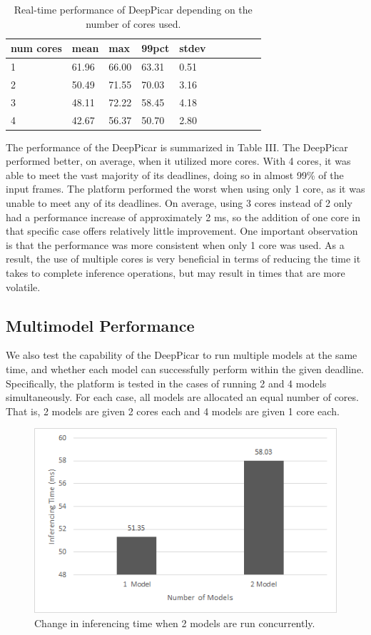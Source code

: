 \begin{table}[h]
  \centering
  \begin{tabular} {| l | l | l | l | l | l | l | l | l | l |}
    \hline
    \textbf{num cores} & \textbf{mean} & \textbf{max} & \textbf{99pct} & \textbf{stdev} \\ \hline 
    1 & 61.96 & 66.00 & 63.31 & 0.51\\ \hline
    2 & 50.49 & 71.55 & 70.03 & 3.16 \\ \hline
    3 & 48.11 & 72.22 & 58.45 & 4.18 \\ \hline
    4 & 42.67 & 56.37 & 50.70 & 2.80 \\
    \hline
  \end{tabular}
  \caption{Real-time performance of DeepPicar depending on the number of cores used.}
\end{table}

The performance of the DeepPicar is summarized in Table III. The DeepPicar performed better, on average, 
when it utilized more cores. With 4 cores, it was able to meet the vast majority of its deadlines, doing 
so in almost 99\% of the input frames. The platform performed the worst when using only 1 core, 
as it was unable to meet any of its deadlines.  On average, using 3 cores instead of 2 only had a 
performance increase of approximately 2 ms, so the addition of one core in that specific case offers 
relatively little improvement. One important observation is that the performance was more consistent 
when only 1 core was used. As a result, the use of multiple cores is very beneficial in terms of 
reducing the time it takes to complete inference operations, but may result in times that are more 
volatile.

\subsection{Multimodel Performance}
We also test the capability of the DeepPicar to run multiple models at the same time, and whether each 
model can successfully perform within the given deadline. Specifically, the platform is tested in the 
cases of running 2 and 4 models simultaneously. For each case, all models are allocated an equal number 
of cores. That is, 2 models are given 2 cores each and 4 models are given 1 core each.

\begin{figure}[h]
  \centering
  \includegraphics[width=.5\textwidth]{figs/2ModelChart}
  \caption{ Change in inferencing time when 2 models are run concurrently. }
\end{figure}

